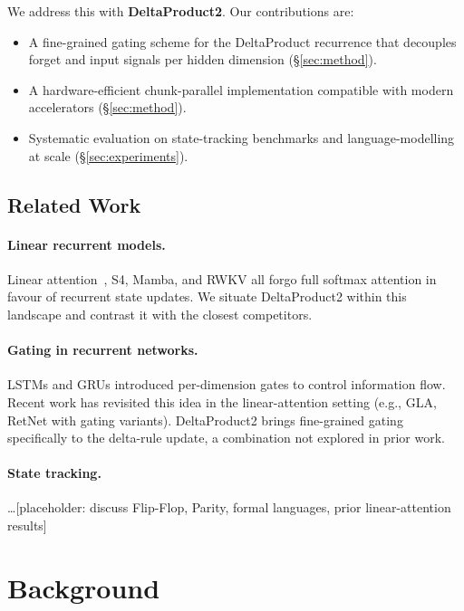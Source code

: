 \documentclass[11pt]{article}
\begin{document}
We address this with \textbf{DeltaProduct2}.
Our contributions are:
\begin{itemize}
  \item A fine-grained gating scheme for the DeltaProduct recurrence that
        decouples forget and input signals per hidden dimension (\S\ref{sec:method}).
  \item A hardware-efficient chunk-parallel implementation compatible with
        modern accelerators (\S\ref{sec:method}).
  \item Systematic evaluation on state-tracking benchmarks and
        language-modelling at scale (\S\ref{sec:experiments}).
\end{itemize}

\subsection{Related Work}

\paragraph{Linear recurrent models.}
Linear attention~\cite{vaswani2017attention}, S4, Mamba, and RWKV all forgo
full softmax attention in favour of recurrent state updates.
We situate DeltaProduct2 within this landscape and contrast it with the
closest competitors.

\paragraph{Gating in recurrent networks.}
LSTMs and GRUs introduced per-dimension gates to control information flow.
Recent work has revisited this idea in the linear-attention setting (e.g.,
GLA, RetNet with gating variants).
DeltaProduct2 brings fine-grained gating specifically to the delta-rule
update, a combination not explored in prior work.

\paragraph{State tracking.}
\ldots [placeholder: discuss Flip-Flop, Parity, formal languages, prior
linear-attention results]

\section{Background}
\label{sec:background}
\end{document}
